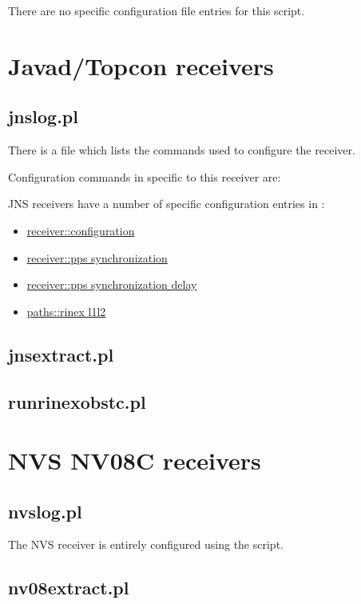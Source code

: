 There are no specific configuration file entries for this script.

\section{Javad/Topcon receivers}

\subsection{jnslog.pl}
\hypertarget{h:jnslog}{}
There is a file  which lists the commands used to configure the receiver.

Configuration commands in  specific to this receiver are:

JNS receivers have a number of specific configuration entries in :
\begin{itemize}
\item \hyperlink{h:configuration}{receiver::configuration}
\item \hyperlink{h:pps_synchronization}{receiver::pps synchronization}
\item \hyperlink{h:pps_synchronization_delay}{receiver::pps synchronization delay}
\item \hyperlink{h:rinex_l1l2}{paths::rinex l1l2}
\end{itemize}

\subsection{jnsextract.pl}

\subsection{runrinexobstc.pl}

\section{NVS NV08C receivers}

\subsection{nvslog.pl}
\hypertarget{h:nvslog}{}

The NVS receiver is entirely configured using the script.

\subsection{nv08extract.pl}

